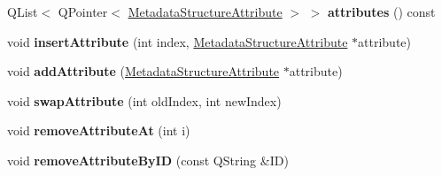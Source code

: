 \begin{DoxyCompactItemize}
\mbox{\label{class_metadata_structure_section_addaee8014aff99842863a18dda45ae2a}} 
Q\+List$<$ Q\+Pointer$<$ \hyperlink{class_metadata_structure_attribute}{Metadata\+Structure\+Attribute} $>$ $>$ {\bfseries attributes} () const
\item 
\mbox{\label{class_metadata_structure_section_a2001c195fee3dbc58964e37942a949cc}} 
void {\bfseries insert\+Attribute} (int index, \hyperlink{class_metadata_structure_attribute}{Metadata\+Structure\+Attribute} $\ast$attribute)
\item 
\mbox{\label{class_metadata_structure_section_a212e10d4319e19ce1de5566920ba8a27}} 
void {\bfseries add\+Attribute} (\hyperlink{class_metadata_structure_attribute}{Metadata\+Structure\+Attribute} $\ast$attribute)
\item 
\mbox{\label{class_metadata_structure_section_a64927ce59c4d5c76a7947eef30c15b06}} 
void {\bfseries swap\+Attribute} (int old\+Index, int new\+Index)
\item 
\mbox{\label{class_metadata_structure_section_ac924205c945e9f918b44e0100e7b719f}} 
void {\bfseries remove\+Attribute\+At} (int i)
\item 
\mbox{\label{class_metadata_structure_section_aff78a2f2092db851c470f9f902b404cc}} 
void {\bfseries remove\+Attribute\+By\+ID} (const Q\+String \&ID)
\end{DoxyCompactItemize}
